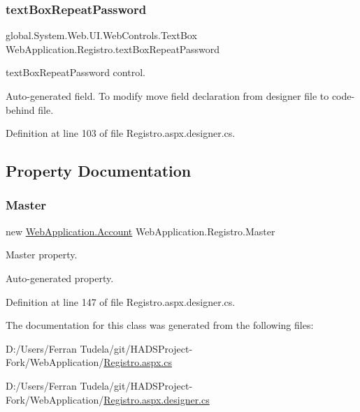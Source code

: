 \subsubsection{\texorpdfstring{textBoxRepeatPassword}{textBoxRepeatPassword}}
{\footnotesize\ttfamily global.\+System.\+Web.\+U\+I.\+Web\+Controls.\+Text\+Box Web\+Application.\+Registro.\+text\+Box\+Repeat\+Password\hspace{0.3cm}{\ttfamily [protected]}}



text\+Box\+Repeat\+Password control. 

Auto-\/generated field. To modify move field declaration from designer file to code-\/behind file. 

Definition at line 103 of file Registro.\+aspx.\+designer.\+cs.



\subsection{Property Documentation}
\mbox{\label{classWebApplication_1_1Registro_a91e9c41ae58c68f45906a1bc3cbeab8e}} 
\subsubsection{\texorpdfstring{Master}{Master}}
{\footnotesize\ttfamily new \mbox{\hyperlink{classWebApplication_1_1Account}{Web\+Application.\+Account}} Web\+Application.\+Registro.\+Master\hspace{0.3cm}{\ttfamily [get]}}



Master property. 

Auto-\/generated property. 

Definition at line 147 of file Registro.\+aspx.\+designer.\+cs.



The documentation for this class was generated from the following files\+:\begin{DoxyCompactItemize}
\item 
D\+:/\+Users/\+Ferran Tudela/git/\+H\+A\+D\+S\+Project-\/\+Fork/\+Web\+Application/\mbox{\hyperlink{Registro_8aspx_8cs}{Registro.\+aspx.\+cs}}\item 
D\+:/\+Users/\+Ferran Tudela/git/\+H\+A\+D\+S\+Project-\/\+Fork/\+Web\+Application/\mbox{\hyperlink{Registro_8aspx_8designer_8cs}{Registro.\+aspx.\+designer.\+cs}}\end{DoxyCompactItemize}
